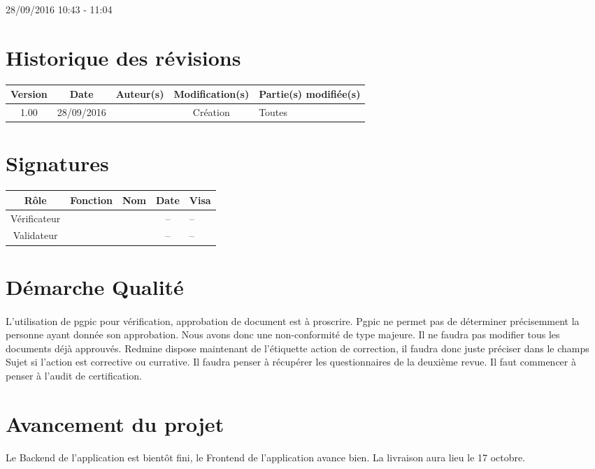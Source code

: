 \documentclass [a4paper] {article}
\begin{document}
\rhead{}

28/09/2016
\hfill   
\hfill 	10:43 - 11:04 				%



\section*{Historique des révisions}
\begin{center}
			\begin{tabular}{| c | c | c | c | p{4cm} |}
				\hline
				\rowcolor{Gray}
				Version & Date & Auteur(s) & Modification(s) & Partie(s) modifiée(s)		 \\
				\hline
				1.00 & 28/09/2016 & \Kafui & Création & Toutes \\
		\hline		
			\end{tabular}
		\end{center}

\section*{Signatures}

		\begin{center}
			\begin{tabular}{| c | c | c | c | p{4cm} |}
				\hline
				\rowcolor{Gray}
				Rôle & Fonction & Nom & Date & Visa		 \\
				\hline
				Vérificateur & \RGC & \Melissa & -- & -- \\[30pt]
				\hline
				Validateur & \CP & \Pierre & -- & -- \\[30pt]	
				\hline
			\end{tabular}
		\end{center}


\section{Démarche Qualité}
\paragraph*{}
L'utilisation de pgpic pour vérification, approbation de document est à proscrire. Pgpic ne permet pas de déterminer précisemment la personne ayant donnée son approbation. Nous avons donc une non-conformité de type majeure. Il ne faudra pas modifier tous les documents déjà approuvés.
Redmine dispose maintenant de l'étiquette action de correction, il faudra donc juste préciser dans le champs Sujet si l'action est corrective ou currative.
Il faudra penser à récupérer les questionnaires de la deuxième revue.
Il faut commencer à penser à l'audit de certification.

\section{Avancement du projet}
\paragraph*{}
Le Backend de l'application est bientôt fini, le Frontend de l'application avance bien. La livraison aura lieu le 17 octobre. 
\end{document}
